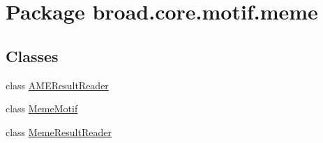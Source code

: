 \hypertarget{namespacebroad_1_1core_1_1motif_1_1meme}{\section{Package broad.\+core.\+motif.\+meme}
\label{namespacebroad_1_1core_1_1motif_1_1meme}
}
\subsection*{Classes}
\begin{DoxyCompactItemize}
\item 
class \hyperlink{classbroad_1_1core_1_1motif_1_1meme_1_1_a_m_e_result_reader}{A\+M\+E\+Result\+Reader}
\item 
class \hyperlink{classbroad_1_1core_1_1motif_1_1meme_1_1_meme_motif}{Meme\+Motif}
\item 
class \hyperlink{classbroad_1_1core_1_1motif_1_1meme_1_1_meme_result_reader}{Meme\+Result\+Reader}
\end{DoxyCompactItemize}
